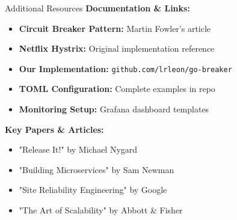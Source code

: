\documentclass[aspectratio=169]{beamer}
\begin{document}
\begin{frame}{Additional Resources}
    \textbf{Documentation \& Links:}
    \begin{itemize}
        \item \textbf{Circuit Breaker Pattern:} Martin Fowler's article
        \item \textbf{Netflix Hystrix:} Original implementation reference
        \item \textbf{Our Implementation:} \texttt{github.com/lrleon/go-breaker}
        \item \textbf{TOML Configuration:} Complete examples in repo
        \item \textbf{Monitoring Setup:} Grafana dashboard templates
    \end{itemize}
    
    \vspace{0.5cm}
    \textbf{Key Papers \& Articles:}
    \begin{itemize}
        \item "Release It!" by Michael Nygard
        \item "Building Microservices" by Sam Newman
        \item "Site Reliability Engineering" by Google
        \item "The Art of Scalability" by Abbott \& Fisher
    \end{itemize}
    
\end{frame}
\end{document}
